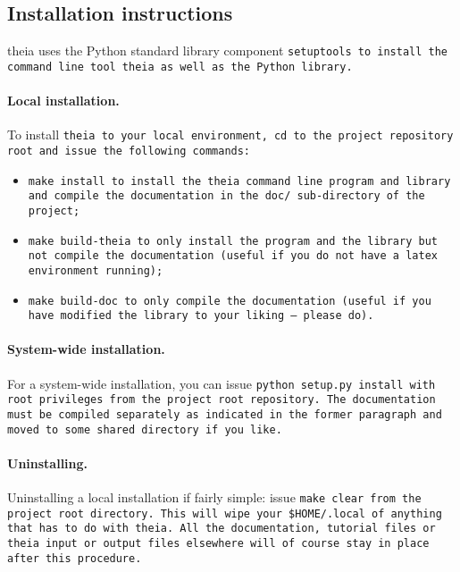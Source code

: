 \documentclass{article}
\begin{document}
\subsection{Installation instructions}
theia uses the Python standard library component \tt{setuptools} to install the command line tool \tt{theia} as well as the Python library. 

\paragraph{Local installation.}To install \tt{theia} to your local environment, \tt{cd} to the project repository root and issue the following commands:

\begin{itemize}
\item \tt{make install} to install the \tt{theia} command line program and library and compile the documentation in the \tt{doc/} sub-directory of the project;
\item \tt{make build-theia} to only install the program and the library but not compile the documentation (useful if you do not have a latex environment running);
\item \tt{make build-doc} to only compile the documentation (useful if you have modified the library to your liking -- please do).
\end{itemize}


\paragraph{System-wide installation.}For a system-wide installation, you can issue \tt{python setup.py install} with root privileges from the project root repository. The documentation must be compiled separately as indicated in the former paragraph and moved to some shared directory if you like.

\paragraph{Uninstalling.} Uninstalling a local installation if fairly simple: issue \tt{make clear} from the project root directory. This will wipe your \tt{\$HOME/.local} of anything that has to do with \tt{theia}. All the documentation, tutorial files or \tt{theia} input or output files elsewhere will of course stay in place after this procedure.
\end{document}
